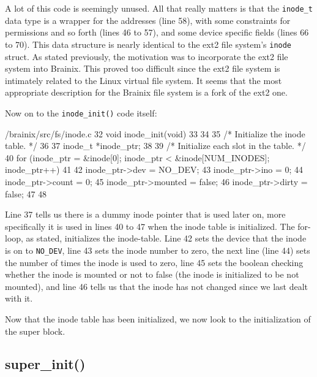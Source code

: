 \documentclass{article}
\begin{document}
A lot of this code is seemingly unused. All that really matters is that the \verb|inode_t| data type is a wrapper for the addresses (line 58), with some constraints for permissions and so forth (lines 46 to 57), and some device specific fields (lines 66 to 70). This data structure is nearly identical to the ext2 file system's \verb|inode| struct. As stated previously, the motivation was to incorporate the ext2 file system into Brainix. This proved too difficult since the ext2 file system is intimately related to the Linux virtual file system. It seems that the most appropriate description for the Brainix file system is a fork of the ext2 one. 

Now on to the \verb|inode_init()| code itself:
\begin{code}{/brainix/src/fs/inode.c}
32 void inode_init(void)
33 {
34 
35 /* Initialize the inode table. */
36
37      inode_t *inode_ptr;
38
39      /* Initialize each slot in the table. */
40      for (inode_ptr = &inode[0]; inode_ptr < &inode[NUM_INODES]; inode_ptr++)
41      {
42           inode_ptr->dev = NO_DEV;
43           inode_ptr->ino = 0;
44           inode_ptr->count = 0;
45           inode_ptr->mounted = false;
46           inode_ptr->dirty = false;
47      }
48 }
\end{code}
Line 37 tells us there is a dummy inode pointer that is used later on, more specifically it is used in lines 40 to 47 when the inode table is initialized. The for-loop, as stated, initializes the inode-table. Line 42 sets the device that the inode is on to \verb|NO_DEV|, line 43 sets the inode number to zero, the next line (line 44) sets the number of times the inode is used to zero, line 45 sets the boolean checking whether the inode is mounted or not to false (the inode is initialized to be not mounted), and line 46 tells us that the inode has not changed since we last dealt with it.

Now that the inode table has been initialized, we now look to the initialization of the super block.

\subsection{super\_init()}
\end{document}
